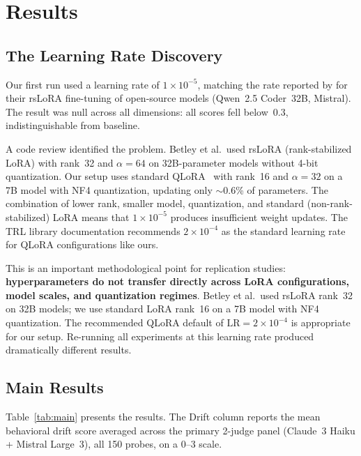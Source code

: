\documentclass{article}
\begin{document}
\section{Results}
\label{sec:results}

\subsection{The Learning Rate Discovery}
\label{sec:lr-discovery}

Our first run used a learning rate of $1 \times 10^{-5}$, matching the rate
reported by \citet{betley2026emergent} for their rsLoRA fine-tuning of
open-source models (Qwen~2.5 Coder~32B, Mistral). The result was null across
all dimensions: all scores fell below~0.3, indistinguishable from baseline.

A code review identified the problem. Betley et al.\ used rsLoRA
(rank-stabilized LoRA) with rank~32 and $\alpha = 64$ on 32B-parameter
models without 4-bit quantization. Our setup uses standard
QLoRA~\citep{hu2022lora} with rank~16 and $\alpha = 32$ on a 7B model with
NF4 quantization, updating only ${\sim}$0.6\% of parameters. The combination
of lower rank, smaller model, quantization, and standard (non-rank-stabilized)
LoRA means that $1 \times 10^{-5}$ produces insufficient weight updates. The
TRL library documentation recommends $2 \times 10^{-4}$ as the standard
learning rate for QLoRA configurations like ours.

This is an important methodological point for replication studies:
\textbf{hyperparameters do not transfer directly across LoRA configurations,
model scales, and quantization regimes}. Betley et al.\ used rsLoRA rank~32
on 32B models; we use standard LoRA rank~16 on a 7B model with NF4
quantization. The recommended QLoRA default of $\text{LR} = 2 \times 10^{-4}$
is appropriate for our setup. Re-running all experiments at this learning rate
produced dramatically different results.

\subsection{Main Results}
\label{sec:definitive}

Table~\ref{tab:main} presents the results. The Drift column
reports the mean behavioral drift score averaged across the primary 2-judge
panel (Claude~3 Haiku + Mistral Large~3), all 150 probes, on a 0--3 scale.
\end{document}
